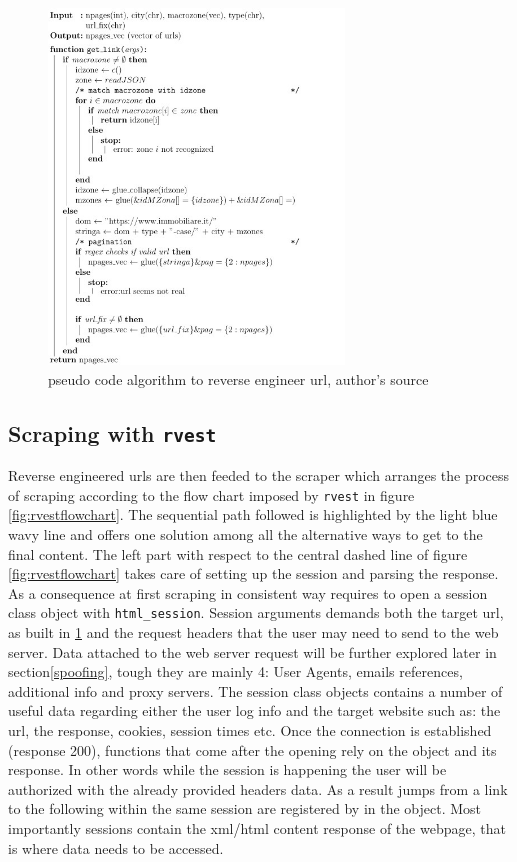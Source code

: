 \documentclass[
  12pt,
  a4paper,
  oneside]{book}
\theoremstyle{definition}
\theoremstyle{definition}
\theoremstyle{definition}
\theoremstyle{remark}
\begin{document}
\begin{figure}
\centering
\includegraphics[width=0.7\textwidth,height=\textheight]{images/pseudocode_latex/pseudocode_get_link.jpg}
\caption{\label{fig:pseudocode3}pseudo code algorithm to reverse engineer url, author's source}
\end{figure}

\hypertarget{scraping-with-rvest}{%
\subsection{\texorpdfstring{Scraping with \texttt{rvest}}{Scraping with rvest}}\label{scraping-with-rvest}}

Reverse engineered urls are then feeded to the scraper which arranges the process of scraping according to the flow chart imposed by \texttt{rvest} in figure \ref{fig:rvestflowchart}. The sequential path followed is highlighted by the light blue wavy line and offers one solution among all the alternative ways to get to the final content. The left part with respect to the central dashed line of figure \ref{fig:rvestflowchart} takes care of setting up the session and parsing the response. As a consequence at first scraping in consistent way requires to open a session class object with \texttt{html\_session}. Session arguments demands both the target url, as built in \ref{fig:pseudocode3} and the request headers that the user may need to send to the web server. Data attached to the web server request will be further explored later in section\ref{spoofing}, tough they are mainly 4: User Agents, emails references, additional info and proxy servers. The session class objects contains a number of useful data regarding either the user log info and the target website such as: the url, the response, cookies, session times etc. Once the connection is established (response 200), functions that come after the opening rely on the object and its response. In other words while the session is happening the user will be authorized with the already provided headers data. As a result jumps from a link to the following within the same session are registered by in the object. Most importantly sessions contain the xml/html content response of the webpage, that is where data needs to be accessed.
\end{document}
